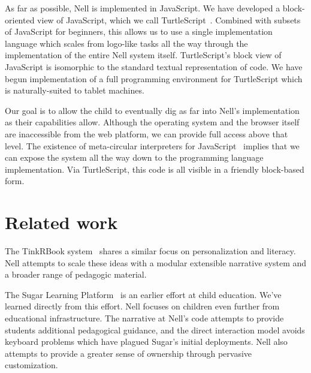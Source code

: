 \documentclass[preprint]{sig-alternate}
\begin{document}
As far as possible, Nell is implemented in JavaScript.  We have
developed a block-oriented view of JavaScript, which we call
TurtleScript~\cite{turtlescript}.  Combined with subsets of JavaScript
for beginners, this allows us to use a single implementation language
which scales from logo-like tasks all the way through the
implementation of the entire Nell system itself.  TurtleScript's block
view of JavaScript is isomorphic to the standard textual
representation of code.  We have begun implementation of a full
programming environment for TurtleScript which is naturally-suited to
tablet machines.


Our goal is to allow the child to eventually dig as far into Nell's
implementation as their capabilities allow.  Although the operating system and
the browser itself are inaccessible from the web platform, we can
provide full access above that level.  The existence of meta-circular
interpreters for JavaScript~\cite{narcissus} implies that we can
expose the system all the way down to the programming language
implementation.  Via TurtleScript, this code is all visible in a
friendly block-based form.


\section{Related work}\label{sec:related}

The TinkRBook system~\cite{chang:tinkrbook} shares a similar focus on
personalization and literacy.  Nell attempts to scale these
ideas with a modular extensible narrative system and a broader range
of pedagogic material.

The Sugar Learning Platform~\cite{sugar} is an earlier effort at
child education.  We've learned directly from this effort.  Nell
focuses on children even further from educational infrastructure.
The narrative at Nell's code attempts to provide students additional
pedagogical guidance, and the direct interaction model avoids keyboard
problems which have plagued Sugar's initial deployments.  Nell also
attempts to provide a greater sense of ownership through pervasive
customization.

\end{document}
